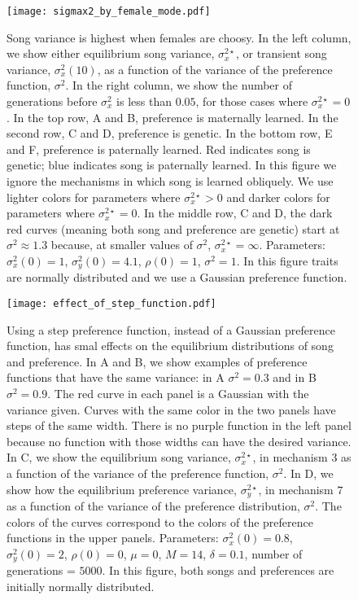 \documentclass[12pt]{article}
\begin{document}
\begin{figure}
\texttt{[image: sigmax2\_by\_female\_mode.pdf]}
\caption{\label{sigmax2_sigma2}  Song variance is highest when females are choosy. In the left column, we show either equilibrium song variance, $\sigma_x^{2\star}$, or transient song variance, $\sigma_x^2(10)$, as a function of the variance of the preference function, $\sigma^2$. In the right column, we show the number of generations before $\sigma_x^2$ is less than $0.05$, for those cases where $\sigma_x^{2\star}=0$. In the top row, A and B, preference is maternally learned. In the second row, C and D, preference is genetic. In the bottom row, E and F, preference is paternally learned. Red indicates song is genetic; blue indicates song is paternally learned. In this figure we ignore the mechanisms in which song is learned obliquely. We use lighter colors for parameters where $\sigma_x^{2\star}>0$ and darker colors for parameters where $\sigma_x^{2\star}=0$. In the middle row, C and D, the dark red curves (meaning both song and preference are genetic) start at $\sigma^2\approx 1.3$ because, at smaller values of $\sigma^2$, $\sigma_x^{2\star}=\infty$. Parameters: $\sigma_x^2(0)=1$, $\sigma_y^2(0)=4.1$, $\rho(0)=1$, $\sigma^2=1$. In this figure traits are normally distributed and we use a Gaussian preference function. }
\end{figure}


\begin{figure}
\texttt{[image: effect\_of\_step\_function.pdf]}
\caption{\label{effect_of_step_function} Using a step preference function, instead of a Gaussian preference function, has smal effects on the equilibrium distributions of song and preference. In A and B, we show examples of preference functions that have the same variance: in A $\sigma^2=0.3$ and in B $\sigma^2=0.9$. The red curve in each panel is a Gaussian with the variance given. Curves with the same color in the two panels have steps of the same width. There is no purple function in the left panel because no function with those widths can have the desired variance. In C, we show the equilibrium song variance, $\sigma_x^{2\star}$, in mechanism $3$ as a function of the variance of the preference function, $\sigma^2$. In D, we show how the equilibrium preference variance, $\sigma_y^{2\star}$, in mechanism $7$ as a function of the variance of the preference distribution, $\sigma^2$. The colors of the curves correspond to the colors of the preference functions in the upper panels. Parameters: $\sigma_x^2(0)=0.8$, $\sigma_y^2(0)=2$, $\rho(0)=0$, $\mu=0$, $M=14$, $\delta=0.1$, number of generations = $5000$. In this figure, both songs and preferences are initially normally distributed.}
\end{figure}
\end{document}
